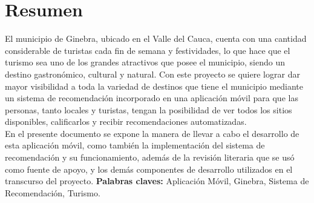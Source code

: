 \documentclass[12pt,letterpaper,openany]{book}
\begin{document}
\chapter*{Resumen} %
El municipio de Ginebra, ubicado en el Valle del Cauca, cuenta con una cantidad considerable de turistas cada fin de semana y festividades, lo que hace que el turismo sea uno de los grandes atractivos que posee el municipio, siendo un destino gastronómico, cultural y natural. Con este proyecto se quiere lograr dar mayor visibilidad a toda la variedad de destinos que tiene el municipio mediante un sistema de recomendación incorporado en una aplicación móvil para que las personas, tanto locales y turistas, tengan la posibilidad de ver todos los sitios disponibles, calificarlos y recibir recomendaciones automatizadas.\\
En el presente documento se expone la manera de llevar a cabo el desarrollo de esta aplicación móvil, como también la implementación del sistema de recomendación y su funcionamiento, además de la revisión literaria que se usó como fuente de apoyo, y los demás componentes de desarrollo utilizados en el transcurso del proyecto.
\vspace{5mm}\newline
\textbf{Palabras claves:} Aplicación Móvil, Ginebra, Sistema de Recomendación, Turismo.


\end{document}
